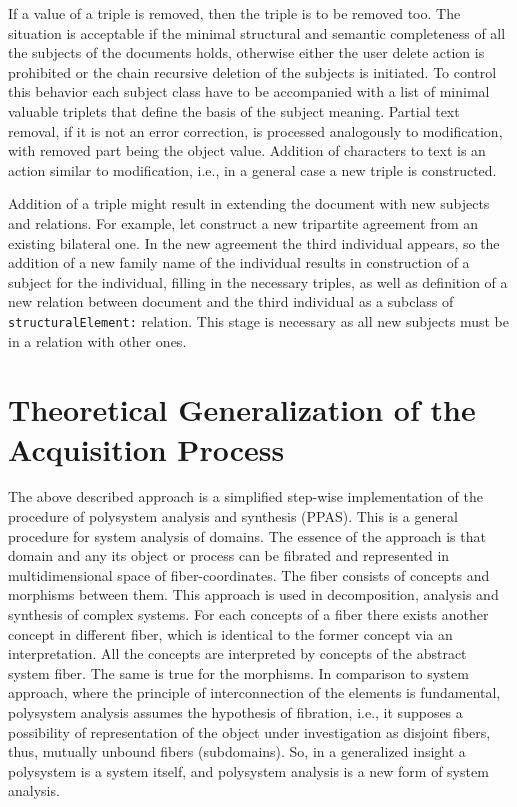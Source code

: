 \documentclass[conference]{IEEEtran}
\begin{document}
If a value of a triple is removed, then the triple is to be removed
too.  The situation is acceptable if the minimal structural and
semantic completeness of all the subjects of the documents holds,
otherwise either the user delete action is prohibited or the chain
recursive deletion of the subjects is initiated.  To control this
behavior each subject class have to be accompanied with a list of
minimal valuable triplets that define the basis of the subject
meaning.  Partial text removal, if it is not an error correction, is
processed analogously to modification, with removed part being the
object value.  Addition of characters to text is an action similar to
modification, i.e., in a general case a new triple is constructed.

Addition of a triple might result in extending the document with new
subjects and relations.  For example, let construct a new tripartite
agreement from an existing bilateral one.  In the new agreement the
third individual appears, so the addition of a new family name of the
individual results in construction of a subject for the individual,
filling in the necessary triples, as well as definition of a new
relation between document and the third individual as a subclass of
\texttt{structuralElement:} relation.  This stage is necessary as all
new subjects must be in a relation with other ones.

\section{Theoretical Generalization of the Acquisition Process}

The above described approach is a simplified step-wise implementation
of the procedure of polysystem analysis and synthesis \cite{father}
(PPAS).  This is a general procedure for system analysis of domains.
The essence of the approach is that domain and any its object or
process can be fibrated and represented in multidimensional space of
fiber-coordinates.  The fiber consists of concepts and morphisms
between them.  This approach is used in decomposition, analysis and
synthesis of complex systems.  For each concepts of a fiber there
exists another concept in different fiber, which is identical to the
former concept via an interpretation.  All the concepts are
interpreted by concepts of the abstract system fiber.  The same is
true for the morphisms.  In comparison to system approach, where the
principle of interconnection of the elements is fundamental,
polysystem analysis assumes the hypothesis of fibration, i.e., it
supposes a possibility of representation of the object under
investigation as disjoint fibers, thus, mutually unbound fibers
(subdomains).  So, in a generalized insight a polysystem is a system
itself, and polysystem analysis is a new form of system analysis.
\end{document}
